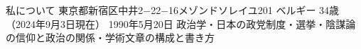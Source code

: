 \begin{rubric}{私について}
    \entry*[\textbf{住所：}] 東京都新宿区中井2−22−16メゾンドソレイユ201%
    \entry*[\textbf{国籍}：] ベルギー%
     34歳（2024年9月3日現在）%
     1990年5月20日%
     政治学・日本の政党制度・選挙・陰謀論の信仰と政治の関係・学術文章の構成と書き方%
\end{rubric}